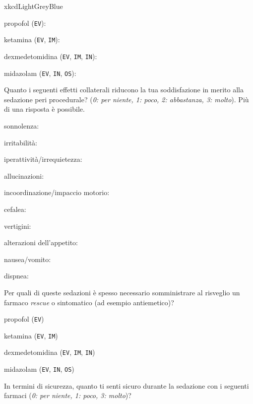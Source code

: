 \begin{survey}{xkcdLightGreyBlue}
    
           propofol (\texttt{EV}): \hfill {} 
           
           ketamina (\texttt{EV}, \texttt{IM}): \hfill {} 
           
           dexmedetomidina (\texttt{EV}, \texttt{IM}, \texttt{IN}): \hfill {} 
           
           midazolam (\texttt{EV}, \texttt{IN}, \texttt{OS}): \hfill {} 
    
       \Query Quanto i seguenti effetti collaterali riducono la tua soddisfazione in merito alla sedazione peri procedurale? (\emph{0: per niente, 1: poco, 2: abbastanza, 3: molto}). Più di una risposta è possibile. 
       
           sonnolenza: \hfill {} 
           
           
           irritabilità:  \hfill {}
           
           iperattività/irrequietezza: \hfill {}
           
           allucinazioni: \hfill {}
           
           incoordinazione/impaccio motorio: \hfill {}
           
           cefalea: \hfill {}
           
           vertigini: \hfill {}
           
           alterazioni dell’appetito: \hfill {}
           
           nausea/vomito: \hfill {}
           
           dispnea: \hfill {}
    
       \Query Per quali di queste sedazioni è spesso necessario somministrare al risveglio un farmaco \emph{rescue} o sintomatico (ad esempio antiemetico)?
       \begin{Qlist}
           \item propofol (\texttt{EV})
           \item ketamina (\texttt{EV}, \texttt{IM})
           \item dexmedetomidina (\texttt{EV}, \texttt{IM}, \texttt{IN})
           \item midazolam (\texttt{EV}, \texttt{IN}, \texttt{OS})
       \end{Qlist}
       
       \Query In termini di sicurezza, quanto ti senti sicuro durante la sedazione con i seguenti farmaci (\emph{0: per niente, 1: poco, 3: molto})?
       

\end{survey}
